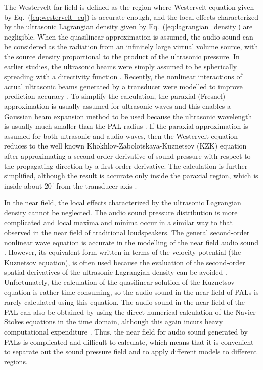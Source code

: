 The Westervelt far field is defined as the region where Westervelt equation given by Eq.~(\ref{eq:westervelt_eq}) is accurate enough, and the local effects characterized by the ultrasonic Lagrangian density given by Eq.~(\ref{eq:lagrangian_density}) are negligible. 
When the quasilinear approximation is assumed, the audio sound can be considered as the radiation from an infinitely large virtual volume source, with the source density proportional to the product of the ultrasonic pressure. 
In earlier studies, the ultrasonic beams were simply assumed to be spherically spreading with a directivity function \cite{Mellen1978NumericalMethodCalculating, Moffett1981NearfieldCharacteristicsParametric}.
Recently, the nonlinear interactions of actual ultrasonic beams generated by a transducer were modelled to improve prediction accuracy \cite{Zhong2020NonparaxialModelAudio, Zhong2020SphericalExpansionAudio}. 
To simplify the calculation, the paraxial (Fresnel) approximation is usually assumed for ultrasonic waves and this enables a Gaussian beam expansion method to be used because the ultrasonic wavelength is usually much smaller than the PAL radius \cite{Cervenka2013NonparaxialModelParametric}. 
If the paraxial approximation is assumed for both ultrasonic and audio waves, then the Westervelt equation reduces to the well known Khokhlov-Zabolotskaya-Kuznetsov (KZK) equation after approximating a second order derivative of sound pressure with respect to the propagating direction by a first order derivative. 
The calculation is further simplified, although the result is accurate only inside the paraxial region, which is inside about $20^\circ$ from the transducer axis \cite{Hamilton2008NonlinearAcoustics}.

In the near field, the local effects characterized by the ultrasonic Lagrangian density cannot be neglected. 
The audio sound pressure distribution is more complicated and local maxima and minima occur in a similar way to that observed in the near field of traditional loudspeakers. 
The general second-order nonlinear wave equation is accurate in the modelling of the near field audio sound \cite{Aanonsen1984DistortionHarmonicGeneration}.
However, its equivalent form written in terms of the velocity potential (the Kuznetsov equation), is often used because the evaluation of the second-order spatial derivatives of the ultrasonic Lagrangian density can be avoided \cite{Cervenka2019VersatileComputationalApproach, Kagawa1992FiniteElementSimulation}.
Unfortunately, the calculation of the quasilinear solution of the Kuznetsov equation is rather time-consuming, so the audio sound in the near field of PALs is rarely calculated using this equation. 
The audio sound in the near field of the PAL can also be obtained by using the direct numerical calculation of the Navier-Stokes equations in the time domain, although this again incurs heavy computational expenditure \cite{Nomura2012NumericalSimulationParametric}. 
Thus, the near field for audio sound generated by PALs is complicated and difficult to calculate, which means that it is convenient to separate out the sound pressure field and to apply different models to different regions.

